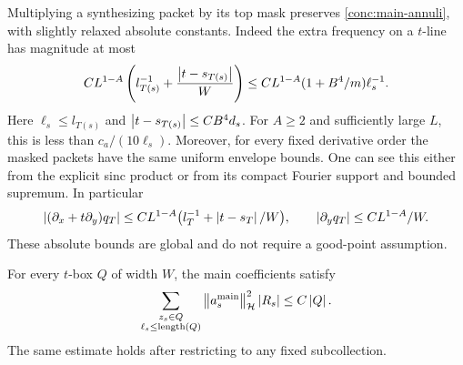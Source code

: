 Multiplying a synthesizing packet by its top mask preserves
\eqref{conc:main-annuli}, with slightly relaxed absolute constants.
Indeed the extra frequency on a $t$-line has magnitude at most
\begin{equation}\label{conc:mask-bandwidth}
 C L^{1-A}\left(l_{T(s)}^{-1}
             +\frac{\left|t-s_{T(s)}\right|}{W}\right)
 \leq C L^{1-A}(1+B^4/m)\ell_s^{-1}.
\end{equation}
Here $\ell_s\leq l_{T(s)}$ and
$\left|t-s_{T(s)}\right|\leq C B^4d_s$.  For $A\geq2$ and sufficiently large
$L$, this is less than $c_a/(10\ell_s)$.  Moreover, for every fixed
derivative order the masked packets have the same uniform envelope
bounds.  One can see this either from the explicit sinc product or
from its compact Fourier support and bounded supremum.  In particular
\begin{equation}\label{conc:mask-derivative}
 \left|(\partial_x+t\partial_y)q_T\right|
 \leq C L^{1-A}\big(l_T^{-1}+\left|t-s_T\right|/W\big),\qquad
 \left|\partial_yq_T\right|\leq C L^{1-A}/W.
\end{equation}
These absolute bounds are global and do not require a good-point
assumption.

\begin{lemma}\label{conc:coefficient-carleson}
For every $t$-box $Q$ of width $W$, the main coefficients satisfy
\begin{equation}\label{eq:src-10}
 \sum_{\substack{z_s\in Q\\\ell_s\leq\mathrm{length}(Q)}}
       \left\|a_s^{\rm main}\right\|_{\mathcal H}^2\left|R_s\right|
       \leq C\left|Q\right|.
\end{equation}
The same estimate holds after restricting to any fixed subcollection.
\end{lemma}

